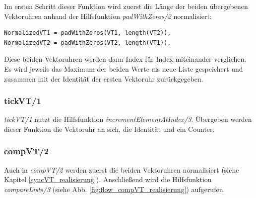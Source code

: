 Im ersten Schritt dieser Funktion wird zuerst die Länge der beiden übergebenen Vektoruhren anhand der Hilfsfunktion \textit{padWithZeros/2} normalisiert:

\begin{lstlisting}
NormalizedVT1 = padWithZeros(VT1, length(VT2)),
NormalizedVT2 = padWithZeros(VT2, length(VT1)),
\end{lstlisting}

Diese beiden Vektoruhren werden dann Index für Index miteinander verglichen. Es wird jeweils das Maximum der beiden Werte als neue Liste gespeichert und zusammen mit der Identität der ersten Vektoruhr zurückgegeben.

\subsubsection{tickVT/1}

\textit{tickVT/1} nutzt die Hilfsfunktion \textit{incrementElementAtIndex/3}. Übergeben werden dieser Funktion die Vektoruhr an sich, die Identität und ein Counter.

\subsubsection{compVT/2}

Auch in \textit{compVT/2} werden zuerst die beiden Vektoruhren normalisiert (siehe Kapitel \ref{syncVT_realisierung}). 
Anschließend wird die Hilfsfunktion \textit{compareLists/3} (siehe Abb. \ref{fig:flow_compVT_realisierung}) aufgerufen.

